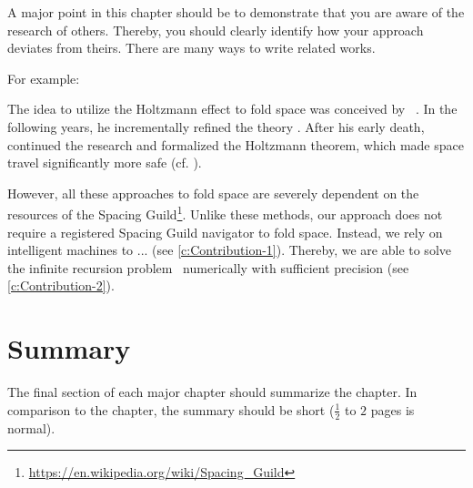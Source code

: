 
A major point in this chapter should be to demonstrate that you are aware of the research of others. Thereby, you should clearly identify how your approach deviates from theirs. There are many ways to write related works.

For example:

The idea to utilize the Holtzmann effect to fold space was conceived \citeyear{HerbertF:1965:Dune} by \citeauthor{HerbertF:1965:Dune}~\cite{HerbertF:1965:Dune}. In the following years, he incrementally refined the theory \cite{HerbertF:1981:God-Emperor,HerbertF:1984:Heretics,Herbert:1985:Chapterhouse}. After his early death, \citeauthor{HerbertB:1999:Atreides}~\cite{HerbertB:1999:Atreides} continued the research and formalized the Holtzmann theorem, which made space travel significantly more safe (cf. \cite{HerbertB:2000:Harkonnen,HerbertB:2001:Corrino,HerbertB:2002:Butlerian-Jihad,HerbertB:2003:Machine-Crusade,HerbertB:2004:Battle-of-Corrin}).

However, all these approaches to fold space are severely dependent on the resources of the Spacing Guild\footnote{\url{https://en.wikipedia.org/wiki/Spacing_Guild}}. Unlike these methods, our approach does not require a registered Spacing Guild navigator to fold space. Instead, we rely on intelligent machines to ... (see \autoref{c:Contribution-1}). Thereby, we are able to solve the infinite recursion problem~\cite{HerbertB:2000:Harkonnen} numerically with sufficient precision (see \autoref{c:Contribution-2}).


\section{Summary}
\label{s:Related-Works-Summary}

The final section of each major chapter should summarize the chapter. In comparison to the chapter, the summary should be short ($\frac{1}{2}$ to $2$ pages is normal).
